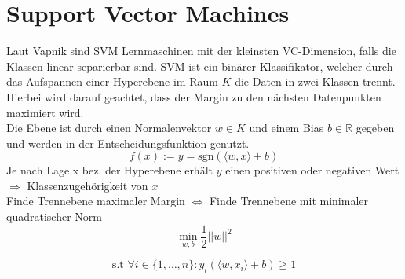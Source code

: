 \chapter{Support Vector Machines}

Laut Vapnik sind SVM Lernmaschinen mit der kleinsten VC-Dimension, falls
die Klassen linear separierbar sind.
SVM ist ein binärer Klassifikator, welcher durch das Aufspannen einer
Hyperebene im Raum $K$ die Daten in zwei Klassen trennt. Hierbei wird darauf geachtet,
dass der Margin zu den nächsten Datenpunkten maximiert wird. \\
Die Ebene ist durch einen Normalenvektor $w \in K$ und einem Bias $b \in \mathbb{R}$
gegeben und werden in der Entscheidungsfunktion genutzt.
\begin{equation}
    f(x) := y = \text{sgn}(\langle w,x\rangle+b)
\end{equation}
Je nach Lage x bez. der Hyperebene erhält $y$ einen positiven oder negativen
Wert $\Rightarrow$ Klassenzugehörigkeit von $x$\\

Finde Trennebene maximaler Margin $\Leftrightarrow$ Finde Trennebene mit minimaler
quadratischer Norm
    \begin{displaymath}
            \min_{w,b} \frac{1}{2}||w||^2
    \end{displaymath}

    \begin{displaymath}
            \text{s.t } \forall i \in \{1,\dots,n\}: y_i(\langle w,x_i\rangle + b) \geq 1
    \end{displaymath}

